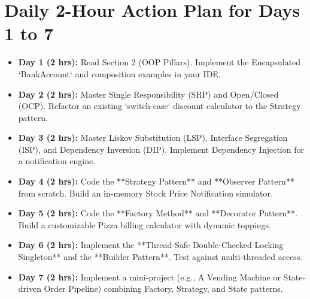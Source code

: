 \documentclass[10pt,journal,compsoc,onecolumn]{IEEEtran}
\begin{document}
\section{Daily 2-Hour Action Plan for Days 1 to 7}
\label{sec:action_plan}

\begin{itemize}
    \item \textbf{Day 1 (2 hrs):} Read Section 2 (OOP Pillars). Implement the Encapsulated `BankAccount` and composition examples in your IDE.
    \item \textbf{Day 2 (2 hrs):} Master Single Responsibility (SRP) and Open/Closed (OCP). Refactor an existing `switch-case` discount calculator to the Strategy pattern.
    \item \textbf{Day 3 (2 hrs):} Master Liskov Substitution (LSP), Interface Segregation (ISP), and Dependency Inversion (DIP). Implement Dependency Injection for a notification engine.
    \item \textbf{Day 4 (2 hrs):} Code the **Strategy Pattern** and **Observer Pattern** from scratch. Build an in-memory Stock Price Notification simulator.
    \item \textbf{Day 5 (2 hrs):} Code the **Factory Method** and **Decorator Pattern**. Build a customizable Pizza billing calculator with dynamic toppings.
    \item \textbf{Day 6 (2 hrs):} Implement the **Thread-Safe Double-Checked Locking Singleton** and the **Builder Pattern**. Test against multi-threaded access.
    \item \textbf{Day 7 (2 hrs):} Implement a mini-project (e.g., A Vending Machine or State-driven Order Pipeline) combining Factory, Strategy, and State patterns.
\end{itemize}
\end{document}
